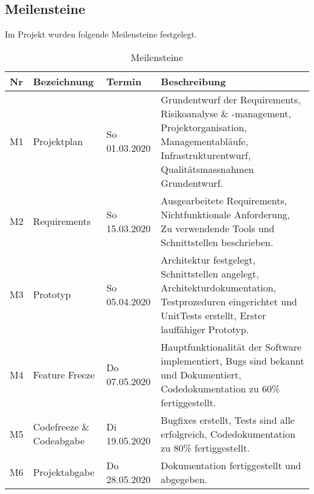 \documentclass[
	ngerman,
	toc=listof, %
	toc=bibliography, %
	footnotes=multiple, %
	parskip=half, %
	numbers=noendperiod %
]{scrartcl}
\begin{document}
	\subsection{Meilensteine}
	Im Projekt wurden folgende Meilensteine festgelegt.
		\begin{table}[!h]	
			\begin{tabularx}{\linewidth}{lllX}
				\toprule
				Nr & Bezeichnung & Termin & Beschreibung \\
				\midrule
				M1 & Projektplan & So 01.03.2020 & Grundentwurf der Requirements, Risikoanalyse \& -management, Projektorganisation, Managementabläufe, Infrastrukturentwurf, Qualitätsmassnahmen Grundentwurf.\\
				\midrule
				M2 & Requirements & So 15.03.2020 & Ausgearbeitete Requirements, Nichtfunktionale Anforderung, Zu verwendende Tools und Schnittstellen beschrieben.\\
				\midrule 
				M3 & Prototyp & So 05.04.2020 & Architektur festgelegt, Schnittstellen angelegt, Architekturdokumentation, Testprozeduren eingerichtet und UnitTests erstellt, Erster lauffähiger Prototyp.\\
				\midrule
				M4 & Feature Freeze & Do 07.05.2020 & Hauptfunktionalität der Software implementiert, Bugs sind bekannt und Dokumentiert, Codedokumentation zu 60\% fertiggestellt.\\
				\midrule
				M5 & Codefreeze \& Codeabgabe & Di 19.05.2020 & Bugfixes erstellt, Tests sind alle erfolgreich, Codedokumentation zu 80\% fertiggestellt.\\
				\midrule
				M6 & Projektabgabe & Do 28.05.2020 & Dokumentation fertiggestellt und abgegeben.\\
				\bottomrule
			\end{tabularx}
		\caption{Meilensteine}
		\end{table}	
\end{document}
